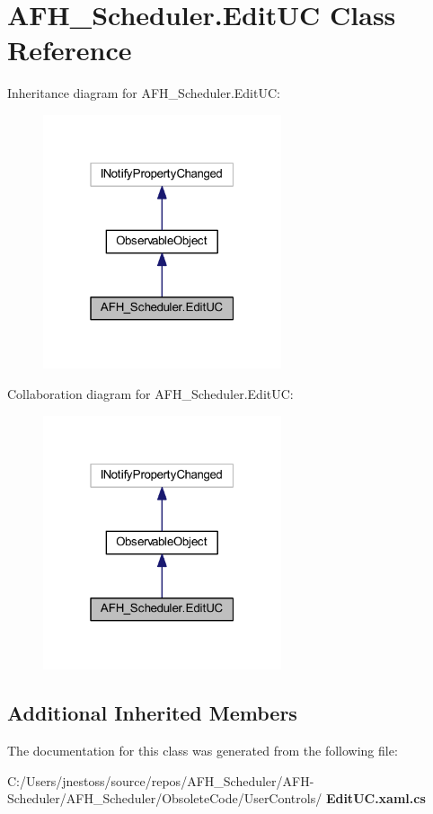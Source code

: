 \section{A\+F\+H\+\_\+\+Scheduler.\+Edit\+UC Class Reference}
\label{class_a_f_h___scheduler_1_1_edit_u_c}


Inheritance diagram for A\+F\+H\+\_\+\+Scheduler.\+Edit\+UC\+:
\nopagebreak
\begin{figure}[H]
\begin{center}
\leavevmode
\includegraphics[width=199pt]{class_a_f_h___scheduler_1_1_edit_u_c__inherit__graph}
\end{center}
\end{figure}


Collaboration diagram for A\+F\+H\+\_\+\+Scheduler.\+Edit\+UC\+:
\nopagebreak
\begin{figure}[H]
\begin{center}
\leavevmode
\includegraphics[width=199pt]{class_a_f_h___scheduler_1_1_edit_u_c__coll__graph}
\end{center}
\end{figure}
\subsection*{Additional Inherited Members}


The documentation for this class was generated from the following file\+:\begin{DoxyCompactItemize}
\item 
C\+:/\+Users/jnestoss/source/repos/\+A\+F\+H\+\_\+\+Scheduler/\+A\+F\+H-\/\+Scheduler/\+A\+F\+H\+\_\+\+Scheduler/\+Obsolete\+Code/\+User\+Controls/\textbf{ Edit\+U\+C.\+xaml.\+cs}\end{DoxyCompactItemize}
